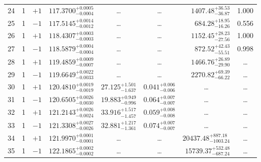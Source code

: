 \begin{table*}[!]
\begin{tabular}{llcrrlrc}
24 & 1 & $+1$ & $    117.3700_{-      0.0004}^{+      0.0005}$ & \multicolumn{1}{c}{\dots} & \multicolumn{1}{c}{\dots} & $     1407.48_{-       36.87}^{+       36.53}$ & 1.000\\[1pt]
25 & 1 & $-1$ & $    117.5145_{-      0.0012}^{+      0.0014}$ & \multicolumn{1}{c}{\dots} & \multicolumn{1}{c}{\dots} & $      684.28_{-       16.26}^{+       18.95}$ & 0.556\\[1pt]
26 & 1 & $+1$ & $    118.4307_{-      0.0003}^{+      0.0003}$ & \multicolumn{1}{c}{\dots} & \multicolumn{1}{c}{\dots} & $     1152.45_{-       27.56}^{+       28.23}$ & 1.000\\[1pt]
27 & 1 & $-1$ & $    118.5879_{-      0.0004}^{+      0.0004}$ & \multicolumn{1}{c}{\dots} & \multicolumn{1}{c}{\dots} & $      872.52_{-       55.51}^{+       42.43}$ & 0.998\\[1pt]
28 & 1 & $+1$ & $    119.4859_{-      0.0007}^{+      0.0009}$ & \multicolumn{1}{c}{\dots} & \multicolumn{1}{c}{\dots} & $     1466.76_{-       29.90}^{+       26.89}$ & \dots \\[1pt]
29 & 1 & $-1$ & $    119.6649_{-      0.0033}^{+      0.0022}$ & \multicolumn{1}{c}{\dots} & \multicolumn{1}{c}{\dots} & $     2270.82_{-       66.22}^{+       69.39}$ & \dots \\[1pt]
30 & 1 & $+1$ & $    120.4810_{-      0.0019}^{+      0.0019}$ & $      27.125_{-       1.637}^{+       1.501}$ & $       0.041_{-       0.006}^{+       0.006}$ & \multicolumn{1}{c}{\dots} & \dots \\[1pt]
31 & 1 & $-1$ & $    120.6505_{-      0.0030}^{+      0.0026}$ & $      19.883_{-       0.996}^{+       0.949}$ & $       0.064_{-       0.007}^{+       0.007}$ & \multicolumn{1}{c}{\dots} & \dots \\[1pt]
32 & 1 & $+1$ & $    121.2143_{-      0.0024}^{+      0.0026}$ & $      33.916_{-       1.457}^{+       1.517}$ & $       0.059_{-       0.008}^{+       0.008}$ & \multicolumn{1}{c}{\dots} & \dots \\[1pt]
33 & 1 & $-1$ & $    121.3308_{-      0.0026}^{+      0.0027}$ & $      32.881_{-       1.361}^{+       1.217}$ & $       0.074_{-       0.007}^{+       0.007}$ & \multicolumn{1}{c}{\dots} & \dots \\[1pt]
34 & 1 & $+1$ & $    121.9970_{-      0.0001}^{+      0.0001}$ & \multicolumn{1}{c}{\dots} & \multicolumn{1}{c}{\dots} & $    20437.48_{-     1003.24}^{+      887.18}$ & \dots \\[1pt]
35 & 1 & $-1$ & $    122.1865_{-      0.0002}^{+      0.0002}$ & \multicolumn{1}{c}{\dots} & \multicolumn{1}{c}{\dots} & $    15739.37_{-      687.24}^{+      532.48}$ & \dots \\[1pt]

\end{tabular}
\end{table*}

